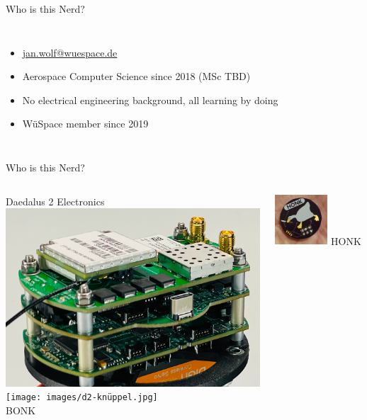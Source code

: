\documentclass{beamer}
\begin{document}
\begin{frame}{Who is this Nerd?}
\begin{columns}
  \begin{itemize}
    \item \href{mailto:jan.wolf@wuespace.de}{jan.wolf@wuespace.de} 
    \item Aerospace Computer Science since 2018 (MSc TBD)
    \item No electrical engineering background, all learning by doing
    \item WüSpace member since 2019
  \end{itemize}
  \end{columns}
\end{frame}

\begin{frame}{Who is this Nerd?}
  \begin{columns}
    Daedalus 2 Electronics
    \includegraphics[width=\textwidth]{images/d2-pcb-stack.png}
  \pause
    \texttt{[image: images/d2-knüppel.jpg]}\\
    BONK
    \vspace{1cm}

  \pause
    \includegraphics[width=0.6\textwidth]{images/honk.jpg}
    HONK
  \end{columns}
\end{frame}
\end{document}
